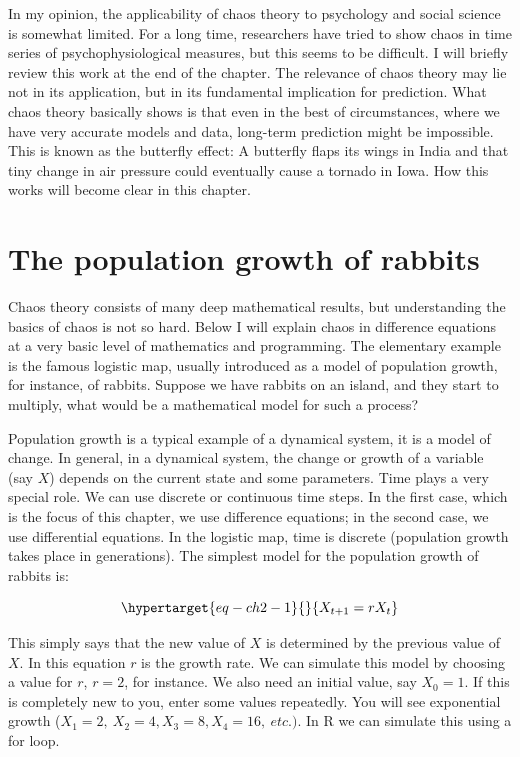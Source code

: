\documentclass[
  a4paper,
  DIV=11,
  numbers=noendperiod]{scrreprt}
\begin{document}
In my opinion, the applicability of chaos theory to psychology and
social science is somewhat limited. For a long time, researchers have
tried to show chaos in time series of psychophysiological measures, but
this seems to be difficult. I will briefly review this work at the end
of the chapter. The relevance of chaos theory may lie not in its
application, but in its fundamental implication for prediction. What
chaos theory basically shows is that even in the best of circumstances,
where we have very accurate models and data, long-term prediction might
be impossible. This is known as the butterfly effect: A butterfly flaps
its wings in India and that tiny change in air pressure could eventually
cause a tornado in Iowa. How this works will become clear in this
chapter.

\hypertarget{sec-The-population-growth-of-rabbits}{%
\section{The population growth of
rabbits}\label{sec-The-population-growth-of-rabbits}}

Chaos theory consists of many deep mathematical results, but
understanding the basics of chaos is not so hard. Below I will explain
chaos in difference equations at a very basic level of mathematics and
programming. The elementary example is the famous logistic map, usually
introduced as a model of population growth, for instance, of rabbits.
Suppose we have rabbits on an island, and they start to multiply, what
would be a mathematical model for such a process?

Population growth is a typical example of a dynamical system, it is a
model of change. In general, in a dynamical system, the change or growth
of a variable (say \(X\)) depends on the current state and some
parameters. Time plays a very special role. We can use discrete or
continuous time steps. In the first case, which is the focus of this
chapter, we use difference equations; in the second case, we use
differential equations. In the logistic map, time is discrete
(population growth takes place in generations). The simplest model for
the population growth of rabbits is:

\begin{equation}\protect\hypertarget{eq-ch2-1}{}{
X_{t + 1} = rX_{t}}\label{eq-ch2-1}\end{equation}

This simply says that the new value of \(X\) is determined by the
previous value of \(X\). In this equation \(r\) is the growth rate. We
can simulate this model by choosing a value for \(r\), \(r=2\), for
instance. We also need an initial value, say \(X_{0} = 1.\) If this is
completely new to you, enter some values repeatedly. You will see
exponential growth
(\(X_{1} = 2,\ X_{2} = 4,X_{3} = 8,X_{4} = 16,\ etc.)\). In R we can
simulate this using a for loop.
\end{document}
